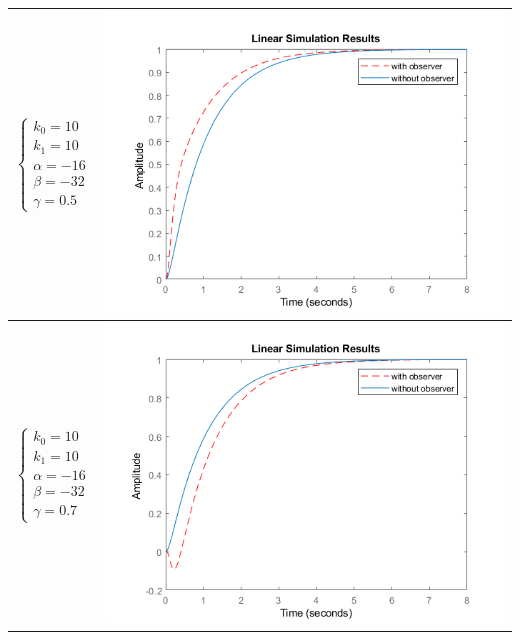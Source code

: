 \begin{longtable}{ | m{4cm} | m{8cm} | }
		$\begin{cases} k_0=10 \\ k_1=10 \\ \alpha=-16 \\ \beta= -32 \\ \gamma=0.5 \end{cases}$ &

		\begin{minipage}{.3\textwidth}
			\includegraphics[scale = 0.48]{images/e3.png}
		\end{minipage}
		\\\hline
		
		$\begin{cases} k_0=10 \\ k_1=10 \\ \alpha=-16 \\ \beta= -32 \\ \gamma=0.7 \end{cases}$ &

		\begin{minipage}{.3\textwidth}
			\includegraphics[scale = 0.48]{images/e4.png}
		\end{minipage}
		\\\hline
		
\end{longtable}

